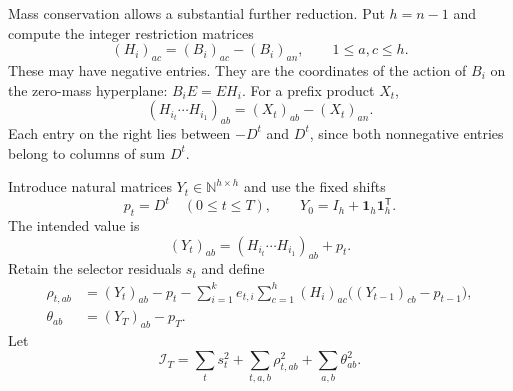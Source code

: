 \documentclass[11pt,letterpaper]{article}
\theoremstyle{definition}
\theoremstyle{remark}
\newcommand{\N}{\mathbb N}
\newcommand{\one}{\mathbf 1}
\newcommand{\transpose}{^{\mathsf T}}
\begin{document}
Mass conservation allows a substantial further reduction. Put $h=n-1$ and
compute the integer restriction matrices
\begin{equation}
 (H_i)_{ac}=(B_i)_{ac}-(B_i)_{an},\qquad 1\leq a,c\leq h.
 \label{ste:ee:eq:integerH}
\end{equation}
These may have negative entries. They are the coordinates of the action of $B_i$
on the zero-mass hyperplane: $B_iE=EH_i$. For a prefix product $X_t$,
\begin{equation}
 (H_{i_t}\cdots H_{i_1})_{ab}=(X_t)_{ab}-(X_t)_{an}.
 \label{ste:ee:eq:restrictiondifference}
\end{equation}
Each entry on the right lies between $-D^t$ and $D^t$, since both nonnegative
entries belong to columns of sum $D^t$.

Introduce natural matrices $Y_t\in\N^{h\times h}$ and use the fixed shifts
\[
 p_t=D^t\quad(0\leq t\leq T),\qquad
 Y_0=I_h+\one_h\one_h\transpose.
\]
The intended value is
\[
 (Y_t)_{ab}=(H_{i_t}\cdots H_{i_1})_{ab}+p_t.
\]
Retain the selector residuals $s_t$ and define
\begin{align}
 \rho_{t,ab}
   &=(Y_t)_{ab}-p_t-
     \sum_{i=1}^k e_{t,i}\sum_{c=1}^h(H_i)_{ac}
                      \bigl((Y_{t-1})_{cb}-p_{t-1}\bigr),\label{ste:ee:eq:compressedrec}\\
 \theta_{ab}&=(Y_T)_{ab}-p_T.\label{ste:ee:eq:compressedterminal}
\end{align}
Let
\begin{equation}
 \mathcal I_T=\sum_t s_t^2+
 \sum_{t,a,b}\rho_{t,ab}^2+\sum_{a,b}\theta_{ab}^2.
 \label{ste:ee:eq:compressedquartic}
\end{equation}
\end{document}
